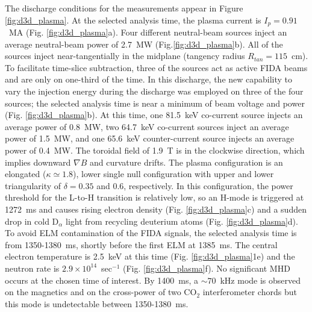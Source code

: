 The discharge conditions for the measurements appear in Figure \ref{fig:d3d_plasma}. At the selected analysis time, the plasma current is $I_p=0.91$~MA (Fig. \ref{fig:d3d_plasma}a). Four different neutral-beam sources inject an average neutral-beam power of 2.7~MW (Fig.\ref{fig:d3d_plasma}b). All of the sources inject near-tangentially in the midplane (tangency radius $R_{tan}=115$~cm). To facilitate time-slice subtraction, three of the sources act as active FIDA beams and are only on one-third of the time. In this discharge, the new capability to vary the injection energy during the discharge \cite{pace2016control} was employed on three of the four sources; the selected analysis time is near a minimum of beam voltage and power (Fig. \ref{fig:d3d_plasma}b). At this time, one 81.5~keV co-current source injects an average power of 0.8~MW, two 64.7~keV co-current sources inject an average power of 1.5~MW, and one 65.6~keV counter-current source injects an average power of 0.4~MW. The toroidal field of 1.9~T is in the clockwise direction, which implies downward $\nabla B$ and curvature drifts. The plasma configuration is an elongated ($\kappa\simeq1.8$), lower single null configuration with upper and lower triangularity of $\delta=0.35$ and 0.6, respectively. In this configuration, the power threshold for the L-to-H transition is relatively low, so an H-mode is triggered at 1272~ms and causes rising electron density (Fig. \ref{fig:d3d_plasma}c) and a sudden drop in cold D$_\alpha$ light from recycling deuterium atoms (Fig. \ref{fig:d3d_plasma}d).  To avoid ELM contamination of the FIDA signals, the selected analysis time is from 1350-1380~ms, shortly before the first ELM at 1385~ms.  The central electron temperature is 2.5~keV at this time (Fig. \ref{fig:d3d_plasma}1e) and the neutron rate is $2.9\times10^{14}$~sec$^{-1}$ (Fig. \ref{fig:d3d_plasma}f).
No significant MHD occurs at the chosen time of interest. By 1400~ms, a $\sim70$~kHz mode is observed on the magnetics and on the cross-power of two CO$_2$ interferometer chords but this mode is undetectable between 1350-1380~ms.

